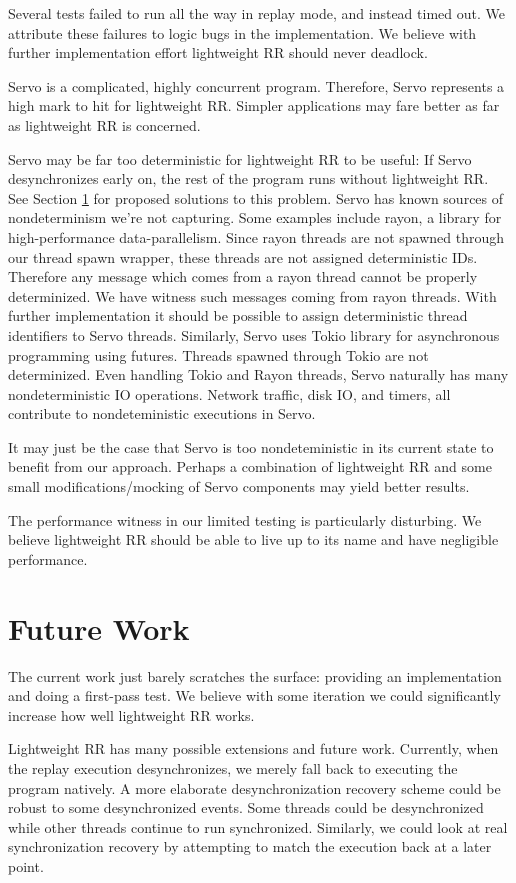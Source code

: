 \documentclass{article}
\begin{document}
Several tests failed to run all the way in replay mode, and instead timed out. We attribute
these failures to logic bugs in the implementation. We believe with further implementation
effort lightweight RR should never deadlock.

Servo is a complicated, highly concurrent program. Therefore, Servo represents a high
mark to hit for lightweight RR. Simpler applications may fare better as far as lightweight
RR is concerned.

Servo may be far too deterministic
for lightweight RR to be useful: If Servo desynchronizes early on, the rest of the program
runs without lightweight RR. See Section \ref{sec:future_work} for proposed solutions to this
problem. Servo has known sources of nondeterminism we're not capturing. Some examples
include rayon, a library for high-performance data-parallelism. Since rayon threads are
not spawned through our thread spawn wrapper, these threads are not assigned deterministic
IDs. Therefore any message which comes from a rayon thread cannot be properly determinized.
We have witness such messages coming from rayon threads.
With further implementation it should be possible to assign deterministic thread
identifiers to Servo threads. Similarly, Servo uses Tokio library for asynchronous programming
using futures. Threads spawned through Tokio are not determinized.
Even handling Tokio and Rayon threads, Servo naturally has many nondeterministic IO operations. Network traffic, disk IO, and timers, all contribute to nondeteministic executions in Servo.

It may just be the case that Servo is too nondeteministic in its current state to benefit
from our approach. Perhaps a combination of lightweight RR and some small modifications/mocking of Servo components may yield better results.

The performance witness in our limited testing is particularly disturbing. We believe
lightweight RR should be able to live up to its name and have negligible performance.

\section{Future Work}
\label{sec:future_work}
The current work just barely scratches the surface: providing an implementation
and doing a first-pass test. We believe with some iteration we could significantly
increase how well lightweight RR works.

Lightweight RR has many possible extensions and future work. Currently, when the replay
execution desynchronizes, we merely fall back to executing the program natively. A more
elaborate desynchronization recovery scheme could be robust to some desynchronized
events. Some threads could be desynchronized while other threads continue to run
synchronized. Similarly, we could look at real synchronization recovery by attempting
to match the execution back at a later point.
\end{document}
